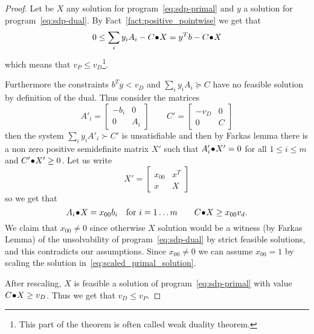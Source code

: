 \documentclass[a4paper,twoside,justified]{tufte-handout}
\begin{document}
\begin{proof}
  Let be $X$ any solution for program~\eqref{eq:sdp-primal} and $ y $
  a solution for program~\eqref{eq:sdp-dual}. By
  Fact~\ref{fact:positive_pointwise} we get that
  \begin{equation}
    0 \leq {\sum_{i} y_{i} A_{i}-C}\!\bullet\!{X} = y^{T}b - {C}\!\bullet\!{X} 
  \end{equation}
  which means that $ v_{P} \leq v_{D}$\footnote{This part of the
    theorem is often called weak duality theorem.}.

  Furthermore the constraints $ b^{T}y < v_{D} $ and $
  \sum_{i}y_{i}A_{i} \succeq C $ have no feasible solution by
  definition of the dual. Thus consider the matrices 
  \begin{equation}
    A'_{i} = \begin{bmatrix}
      -b_{i} & 0\\
      0 & A_{i}
    \end{bmatrix}
    \qquad
    C' = \begin{bmatrix}
      -v_{D} & 0\\
      0 & C
  \end{bmatrix}
  \end{equation}
  then the system $ \sum_{i}y_{i}A'_{i} \succ C' $ is unsatisfiable
  and then by Farkas lemma there is a non zero positive semidefinite
  matrix $X'$ such that $ {A'_{i}}\!\bullet\!{X'} = 0 $ for all $
  1\leq i\leq m $ and ${C'}\!\bullet\!{X'} \geq 0 $. Let us write
  \begin{equation}
    X'=\begin{bmatrix}
      x_{00} & x^{T}\\
      x & X
    \end{bmatrix}
  \end{equation}
  so we get that 
  \begin{equation}\label{eq:scaled_primal_solution}
    \pointwiseprod{A_{i}}{X} = x_{00}b_{i} \quad 
    \text{for $i=1\ldots m$}
    \qquad 
    \pointwiseprod{C}{X} \geq x_{00}v_{d}.
  \end{equation}
  We claim that $ x_{00} \not= 0$ since otherwise $ X $ solution would
  be a witness (by Farkas Lemma) of the unsolvability of
  program~\eqref{eq:sdp-dual} by strict feasible solutions, and this
  contradicts our assumptions. Since $ x_{00}\not=0 $ we can assume $
  x_{00}=1 $ by scaling the solution in~\eqref{eq:scaled_primal_solution}. 

  After rescaling, $ X $ is feasible a solution of
  program~\eqref{eq:sdp-primal} with value $ {C}\!\bullet\!{X}\geq
  v_{D} $. Thus we get that $ v_{D}\leq v_{P} $.
\end{proof}
\end{document}
